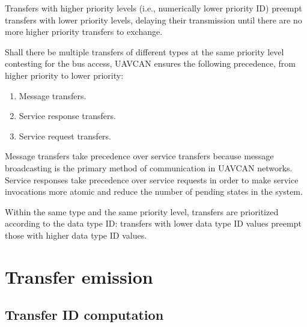 Transfers with higher priority levels (i.e., numerically lower priority ID)
preempt transfers with lower priority levels, delaying their transmission
until there are no more higher priority transfers to exchange.

Shall there be multiple transfers of different types at the same priority level contesting for the bus access,
UAVCAN ensures the following precedence, from higher priority to lower priority:

\begin{enumerate}
    \item Message transfers.
    \item Service response transfers.
    \item Service request transfers.
\end{enumerate}

Message transfers take precedence over service transfers because message broadcasting is the primary method of
communication in UAVCAN networks.
Service responses take precedence over service requests in order to make service invocations more atomic
and reduce the number of pending states in the system.

Within the same type and the same priority level,
transfers are prioritized according to the data type ID:
transfers with lower data type ID values preempt those with higher data type ID values.

\section{Transfer emission}

\subsection{Transfer ID computation}\label{sec:transfer_id}\label{sec:transfer_descriptor}

